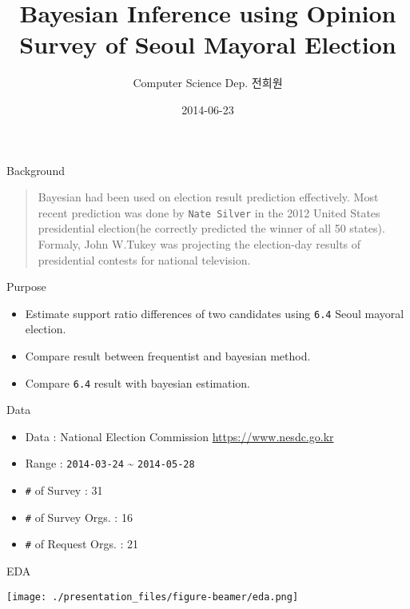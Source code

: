 \documentclass[ignorenonframetext,]{beamer}
\title{Bayesian Inference using Opinion Survey of Seoul Mayoral Election}
\author{Computer Science Dep. 전희원}
\date{2014-06-23}
\makeatletter
\def\maxwidth{\ifdim\Gin@nat@width>\linewidth\linewidth\else\Gin@nat@width\fi}
\def\maxheight{\ifdim\Gin@nat@height>\textheight0.8\textheight\else\Gin@nat@height\fi}
\renewcommand{\includegraphics}[2][]{%
    \Oldincludegraphics[#1,width=\maxwidth,height=\maxheight,keepaspectratio]{#2}}
\makeatother
\begin{document}
\frame{\titlepage}

\begin{frame}{Background}

\begin{quote}
Bayesian had been used on election result prediction effectively. Most
recent prediction was done by \texttt{Nate Silver} in the 2012 United
States presidential election(he correctly predicted the winner of all 50
states). Formaly, John W.Tukey was projecting the election-day results
of presidential contests for national television.
\end{quote}

\end{frame}

\begin{frame}{Purpose}

\begin{itemize}
\itemsep1pt\parskip0pt
\item
  Estimate support ratio differences of two candidates using
  \texttt{6.4} Seoul mayoral election.
\item
  Compare result between frequentist and bayesian method.
\item
  Compare \texttt{6.4} result with bayesian estimation.
\end{itemize}

\end{frame}

\begin{frame}{Data}

\begin{itemize}
\itemsep1pt\parskip0pt
\item
  Data : National Election Commission \url{https://www.nesdc.go.kr}
\item
  Range : \texttt{2014-03-24} \textasciitilde{} \texttt{2014-05-28}
\item
  \texttt{\#} of Survey : 31
\item
  \texttt{\#} of Survey Orgs. : 16
\item
  \texttt{\#} of Request Orgs. : 21
\end{itemize}

\end{frame}

\begin{frame}{EDA}

\texttt{[image: ./presentation\_files/figure-beamer/eda.png]}

\end{frame}
\end{document}
